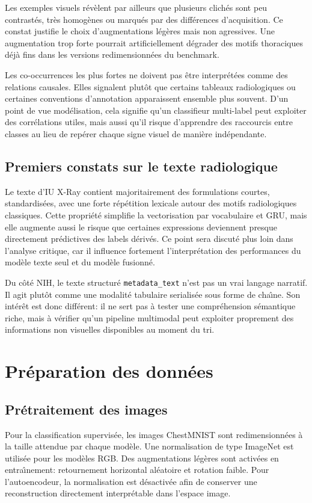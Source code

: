 \documentclass[11pt,a4paper]{article}
\newif\ifsectionbreakenabled
\let\oldsection\section
\renewcommand{\section}[1]{%
    \ifsectionbreakenabled
        \clearpage
    \else
        \sectionbreakenabledtrue
    \fi
    \oldsection{#1}%
}
\begin{document}
Les exemples visuels r\'ev\`elent par ailleurs que plusieurs clich\'es sont peu contrast\'es, tr\`es homog\`enes ou marqu\'es par des diff\'erences d'acquisition. Ce constat justifie le choix d'augmentations l\'eg\`eres mais non agressives. Une augmentation trop forte pourrait artificiellement d\'egrader des motifs thoraciques d\'ej\`a fins dans les versions redimensionn\'ees du benchmark.

Les co-occurrences les plus fortes ne doivent pas \^etre interpr\'et\'ees comme des relations causales. Elles signalent plut\^ot que certains tableaux radiologiques ou certaines conventions d'annotation apparaissent ensemble plus souvent. D'un point de vue mod\'elisation, cela signifie qu'un classifieur multi-label peut exploiter des corr\'elations utiles, mais aussi qu'il risque d'apprendre des raccourcis entre classes au lieu de rep\'erer chaque signe visuel de mani\`ere ind\'ependante.

\subsection{Premiers constats sur le texte radiologique}
Le texte d'IU X-Ray contient majoritairement des formulations courtes, standardis\'ees, avec une forte r\'ep\'etition lexicale autour des motifs radiologiques classiques. Cette propri\'et\'e simplifie la vectorisation par vocabulaire et GRU, mais elle augmente aussi le risque que certaines expressions deviennent presque directement pr\'edictives des labels d\'eriv\'es. Ce point sera discut\'e plus loin dans l'analyse critique, car il influence fortement l'interpr\'etation des performances du mod\`ele texte seul et du mod\`ele fusionn\'e.

Du c\^ot\'e NIH, le texte structur\'e \texttt{metadata\_text} n'est pas un vrai langage narratif. Il agit plut\^ot comme une modalit\'e tabulaire serialis\'ee sous forme de cha\^\i ne. Son int\'er\^et est donc diff\'erent: il ne sert pas \`a tester une compr\'ehension s\'emantique riche, mais \`a v\'erifier qu'un pipeline multimodal peut exploiter proprement des informations non visuelles disponibles au moment du tri.

\section{Pr\'eparation des donn\'ees}
\subsection{Pr\'etraitement des images}
Pour la classification supervis\'ee, les images ChestMNIST sont redimensionn\'ees \`a la taille attendue par chaque mod\`ele. Une normalisation de type ImageNet est utilis\'ee pour les mod\`eles RGB. Des augmentations l\'eg\`eres sont activ\'ees en entra\^\i nement: retournement horizontal al\'eatoire et rotation faible. Pour l'autoencodeur, la normalisation est d\'esactiv\'ee afin de conserver une reconstruction directement interpr\'etable dans l'espace image.
\end{document}
